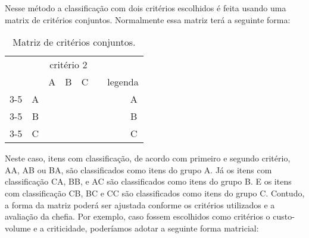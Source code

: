 \documentclass{book}
\begin{document}
Nesse método a classificação com dois critérios escolhidos é feita usando uma matrix de critérios conjuntos. Normalmente essa matriz terá a seguinte forma:

\begin{table}[h]
\begin{center}
\begin{tabular}[c]{c c | c | c | c | c c c c}
&\multicolumn{1}{c}{}  & \multicolumn{3}{c}{critério 2} \\ 
& \multicolumn{1}{c}{} &\multicolumn{1}{c}{A} &\multicolumn{1}{c}{B} & \multicolumn{1}{c}{C} & & \multicolumn{3}{c}{legenda} \\
\cline {3-5}
 \multirow{3}{*}{\begin{turn}{90} critério 1 \end{turn}}  & A & \cellcolor{green} & \cellcolor{green} & \multicolumn{1}{|b|}{} & &  & \cellcolor{green} & A \\ 
\cline {3-5}
& B & \cellcolor{green} &  \multicolumn{1}{|b|}{} & \cellcolor{yellow}  & & & \cellcolor{blue} & B \\
\cline {3-5}
& C & \multicolumn{1}{|b|}{} &  \cellcolor{yellow} & \cellcolor{yellow} & & & \cellcolor{yellow} & C\\ 
\end{tabular}
\label{tab:jointMatrix}
\caption{Matriz de critérios conjuntos.}
\end{center}
\end{table}

Neste caso, itens com classificação, de acordo com primeiro e segundo critério, AA, AB ou BA, são classificados como itens do grupo A. Já os itens com classificação CA, BB, e AC são classificados como itens do grupo B. E os itens com classificação CB, BC e CC são classificados como itens do grupo C. Contudo, a forma da matriz poderá ser ajustada conforme os critérios utilizados e a avaliação da chefia. Por exemplo, caso fossem escolhidos como critérios o custo-volume e a criticidade, poderíamos adotar a seguinte forma matricial:
\end{document}
